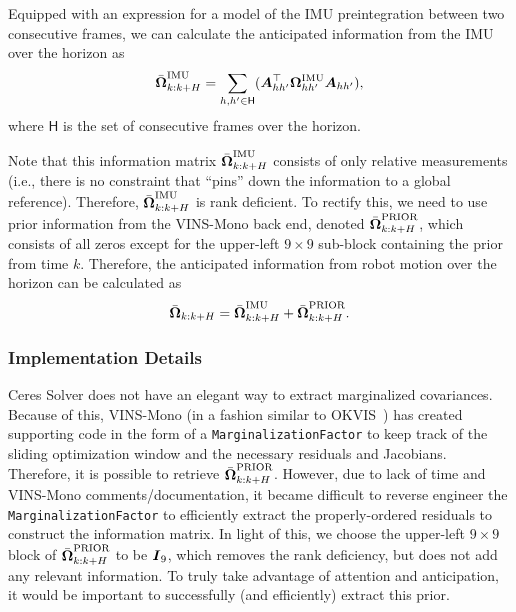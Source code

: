 Equipped with an expression for a model of the IMU preintegration between two consecutive frames, we can calculate the anticipated information from the IMU over the horizon as
\begin{equation}\label{eqn:omega-imu-sum}
\bar{\boldsymbol \Omega}_{k:k+H}^\text{IMU} = \sum_{h,h'\in\mathsf{H}} (\boldsymbol A_{hh'}^\top{\boldsymbol \Omega}^\text{IMU}_{hh'}\boldsymbol A_{hh'}),
\end{equation}
where $\mathsf{H}$ is the set of consecutive frames over the horizon.

Note that this information matrix $\bar{\boldsymbol \Omega}_{k:k+H}^\text{IMU}$ consists of only relative measurements (i.e., there is no constraint that ``pins'' down the information to a global reference).
Therefore, $\bar{\boldsymbol \Omega}_{k:k+H}^\text{IMU}$ is rank deficient.
To rectify this, we need to use prior information from the VINS-Mono back end, denoted $\bar{\boldsymbol \Omega}_{k:k+H}^\text{PRIOR}$, which consists of all zeros except for the upper-left $9\times9$ sub-block containing the prior from time $k$.
Therefore, the anticipated information from robot motion over the horizon can be calculated as
\begin{equation}
\bar{\boldsymbol \Omega}_{k:k+H} = \bar{\boldsymbol \Omega}_{k:k+H}^\text{IMU} + \bar{\boldsymbol \Omega}_{k:k+H}^\text{PRIOR}.
\end{equation}

\subsubsection*{Implementation Details}
Ceres Solver does not have an elegant way to extract marginalized covariances.
Because of this, VINS-Mono (in a fashion similar to OKVIS~\cite{Leutenegger2015}) has created supporting code in the form of a \texttt{MarginalizationFactor} to keep track of the sliding optimization window and the necessary residuals and Jacobians.
Therefore, it is possible to retrieve $\bar{\boldsymbol \Omega}_{k:k+H}^\text{PRIOR}$.
However, due to lack of time and VINS-Mono comments/documentation, it became difficult to reverse engineer the \texttt{MarginalizationFactor} to efficiently extract the properly-ordered residuals to construct the information matrix.
In light of this, we choose the upper-left $9\times9$ block of $\bar{\boldsymbol \Omega}_{k:k+H}^\text{PRIOR}$ to be $\boldsymbol I_9$, which removes the rank deficiency, but does not add any relevant information.
To truly take advantage of attention and anticipation, it would be important to successfully (and efficiently) extract this prior.

